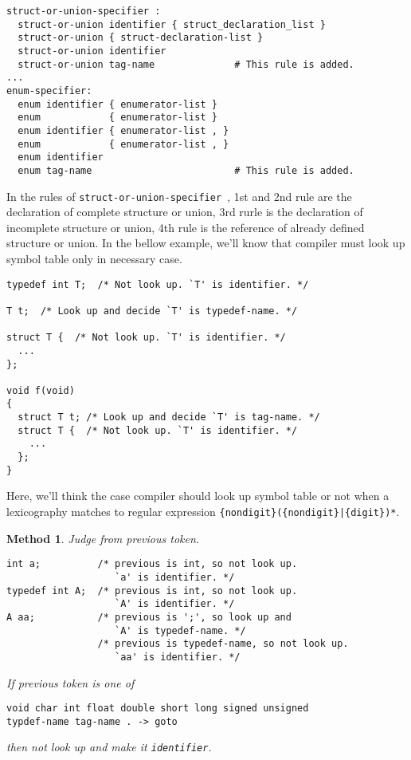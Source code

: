 \begin{verbatim}
struct-or-union-specifier :
  struct-or-union identifier { struct_declaration_list }
  struct-or-union { struct-declaration-list }
  struct-or-union identifier
  struct-or-union tag-name              # This rule is added.
...
enum-specifier:
  enum identifier { enumerator-list }
  enum            { enumerator-list }
  enum identifier { enumerator-list , }
  enum            { enumerator-list , }
  enum identifier
  enum tag-name                         # This rule is added.
\end{verbatim}
In the rules of {\tt struct-or-union-specifier },
1st and 2nd rule are the declaration of complete structure or union,
3rd rurle is the declaration of incomplete structure or union,
4th rule is the reference of already defined structure or union.
In the bellow example, we'll know that compiler must look up
symbol table only in necessary case.
\begin{verbatim}
typedef int T;  /* Not look up. `T' is identifier. */

T t;  /* Look up and decide `T' is typedef-name. */

struct T {  /* Not look up. `T' is identifier. */
  ...
};

void f(void)
{
  struct T t; /* Look up and decide `T' is tag-name. */
  struct T {  /* Not look up. `T' is identifier. */ 
    ...
  };
}
\end{verbatim}
Here, we'll think the case compiler should look up symbol table
or not when a lexicography matches to regular expression
{\tt \{nondigit\}(\{nondigit\}|\{digit\})*}.

\newtheorem{Method}{Method}[chapter]

\begin{Method}
\label{lex_yacc_e002}
Judge from previous token.

\begin{verbatim}
int a;          /* previous is int, so not look up.
                   `a' is identifier. */
typedef int A;  /* previous is int, so not look up.
                   `A' is identifier. */
A aa;           /* previous is ';', so look up and
                   `A' is typedef-name. */
                /* previous is typedef-name, so not look up.
                   `aa' is identifier. */
\end{verbatim}

If previous token is one of
\begin{verbatim}
void char int float double short long signed unsigned
typdef-name tag-name . -> goto
\end{verbatim}
then not look up and make it  {\tt{identifier}}.
\end{Method}

